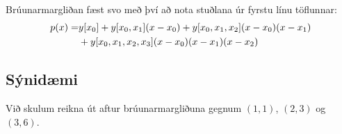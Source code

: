 \documentclass[A4paper,10pt,icelandic]{sphinxmanual}
\begin{document}
Brúunarmargliðan fæst svo með því að nota stuðlana úr fyrstu línu
töflunnar:
\begin{gather}
\begin{split}\begin{aligned}
  p(x) = &y[x_0] + y[x_0,x_1](x-x_0)
  + y[x_0,x_1,x_2](x-x_0)(x-x_1) \\
  &+ y[x_0,x_1,x_2,x_3](x-x_0)(x-x_1)(x-x_2)\end{aligned}\end{split}\notag
\end{gather}

\subsection{Sýnidæmi}
\label{kafli03:id2}
Við skulum reikna út aftur brúunarmargliðuna gegnum \((1,1)\),
\((2,3)\) og \((3,6)\).
\end{document}
